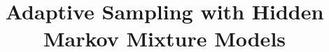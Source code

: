 \documentclass{article} %
\title{Adaptive Sampling with Hidden Markov Mixture Models}
\author{
  
}
\begin{document}
\maketitle

\begin{abstract}
  
\end{abstract}




%
%
\end{document}
